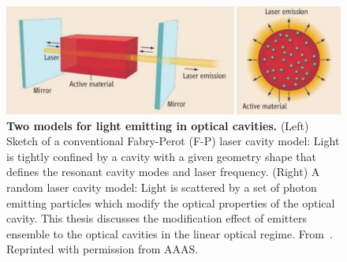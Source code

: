 \begin{figure}[htp]%
\centering
\begin{center}
\includegraphics[width=12cm]{./Figs/F1_medium}
\end{center}
\caption[Unified models for light emitting in optical cavities.]{\textbf{Two models for light emitting in optical cavities.} (Left) Sketch of a conventional Fabry-Perot (F-P) laser cavity model: Light is tightly confined by a cavity with a given geometry shape that defines the resonant cavity modes and laser frequency. (Right) A random laser cavity model: Light is scattered by a set of photon emitting particles which modify the optical properties of the optical cavity. This thesis discusses the modification effect of emitters ensemble to the optical cavities in the linear optical regime. From~\cite{Bravo-Abad2008}. Reprinted with permission from AAAS.}
\label{unifiedlasermodel}
\end{figure}




